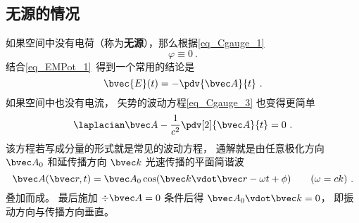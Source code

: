 \subsection{无源的情况}
如果空间中没有电荷（称为\textbf{无源}），那么根据\autoref{eq_Cgauge_1}
\begin{equation}\label{eq_Cgauge_5}
\varphi \equiv 0~.
\end{equation}
结合\autoref{eq_EMPot_1}~得到一个常用的结论是
\begin{equation}\label{eq_Cgauge_2}
\bvec {E}(t) = -\pdv{\bvec A}{t}~.
\end{equation}
如果空间中也没有电流， 矢势的波动方程\autoref{eq_Cgauge_3} 也变得更简单
\begin{equation}
\laplacian \bvec A - \frac{1}{c^2} \pdv[2]{\bvec A}{t} = 0~.
\end{equation}
该方程若写成分量的形式就是常见的波动方程， 通解就是由任意极化方向 $\bvec A_0$ 和延传播方向 $\bvec k$ 光速传播的平面简谐波
\begin{equation}
\bvec A(\bvec r, t) = \bvec A_0 \cos(\bvec k \vdot \bvec r - \omega t + \phi) \qquad (\omega = ck)~.
\end{equation}
叠加而成。 最后施加 $\div \bvec A = 0$ 条件后得 $\bvec A_0 \vdot \bvec k = 0$， 即振动方向与传播方向垂直。
